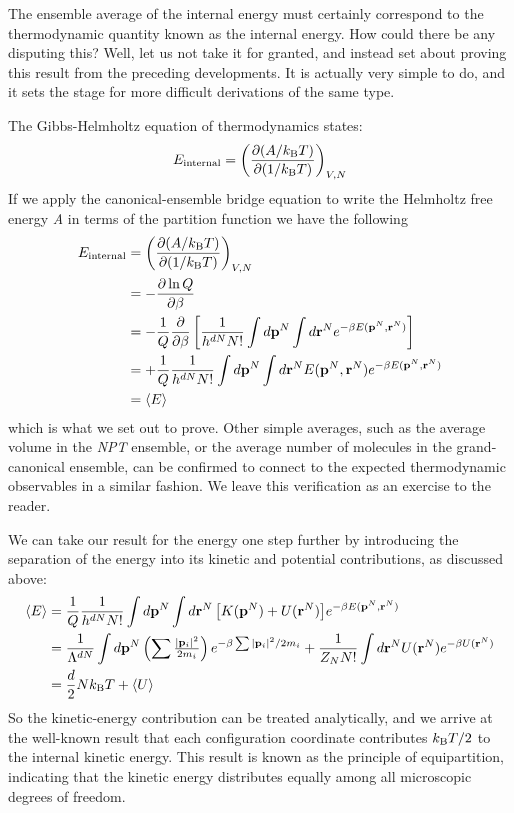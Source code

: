 \documentclass[]{article}
\begin{document}
The ensemble average of the internal energy must certainly correspond to
the thermodynamic quantity known as the internal energy. How could there
be any disputing this? Well, let us not take it for granted, and instead
set about proving this result from the preceding developments. It is
actually very simple to do, and it sets the stage for more difficult
derivations of the same type.

The Gibbs-Helmholtz equation of thermodynamics states:
\[{E_{{\rm{internal}}}} = {\left( {\frac{{\partial (A/{k_{\rm B}}T)}}{{\partial (1/{k_{\rm B}}T)}}} \right)_{V,N}}\]
If we apply the canonical-ensemble bridge equation to write the
Helmholtz free energy \emph{A} in terms of the partition function we
have the following
\begin{align*}
{E_{{\rm{internal}}}} &= {\left( {\frac{{\partial (A/k_{\rm B}T)}}{{\partial (1/k_{\rm B}T)}}} \right)_{V,N}}\\
 &=  - \frac{{\partial \ln Q}}{{\partial \beta }}\\
 &=  - \frac{1}{Q}\frac{\partial }{{\partial \beta }}\left[\frac{1}{h^{dN}N!}\int {d{{\bf p}^N}\int {d{{\bf r}^N}} {e^{ - \beta E({{\bf p}^N},{{\bf r}^N})}}} \right]\\
 &=  + \frac{1}{Q}{\frac{1}{h^{dN}N!}\int {d{{\bf p}^N}\int {d{{\bf r}^N}E({{\bf p}^N},{{\bf r}^N})} {e^{ - \beta E({{\bf p}^N},{{\bf r}^N})}}}} \\
 &= \left\langle E \right\rangle 
\end{align*}
which is what we set out to prove. Other simple averages, such as the
average volume in the \emph{NPT} ensemble, or the average number of molecules
in the grand-canonical ensemble, can be confirmed to connect to the
expected thermodynamic observables in a similar fashion. We leave this
verification as an exercise to the reader.

We can take our result for the energy one step further by introducing
the separation of the energy into its kinetic and potential
contributions, as discussed above:
\begin{align*}
\left\langle E \right\rangle  &= \frac{1}{Q}\frac{1}{{{h^{dN}}N!}}\int {d{{\bf{p}}^N}\int {d{{\bf{r}}^N}\left[ {K({{\bf{p}}^N}) + U({{\bf{r}}^N})} \right]} {e^{ - \beta E({{\bf{p}}^N},{{\bf{r}}^N})}}} \\
 &= \frac{1}{{{\Lambda ^{dN}}}}\int {d{{\bf{p}}^N}\left( {\sum {{\textstyle{{{{\left| {{{\bf{p}}_i}} \right|}^2}} \over {2{m_i}}}}} } \right){e^{ - \beta \sum {{{\left| {{{\bf{p}}_i}} \right|}^2}/2{m_i}} }}}  + \frac{1}{{{Z_N}N!}}\int {d{{\bf{r}}^N}U({{\bf{r}}^N}){e^{ - \beta U({{\bf{r}}^N})}}} \\
 &= \frac{d}{2}Nk_{\rm B}T + \left\langle U \right\rangle 
\end{align*}
So the kinetic-energy contribution can be treated analytically, and we
arrive at the well-known result that each configuration coordinate
contributes $k_{\rm B}T/2$ to the internal kinetic energy. This result is known as
the principle of equipartition, indicating that the kinetic energy
distributes equally among all microscopic degrees of freedom.
\end{document}
